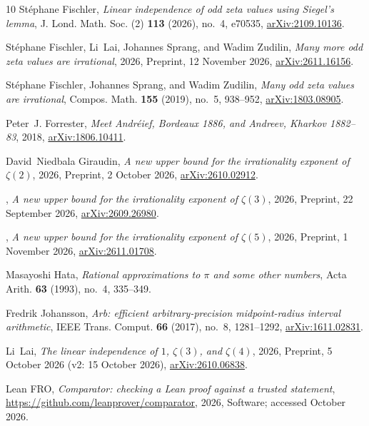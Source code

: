 \documentclass[11pt]{amsart}
\theoremstyle{definition}
\theoremstyle{remark}
\numberwithin{equation}{section}
\begin{document}
\begin{thebibliography}{10}
St\'ephane Fischler, \emph{Linear independence of odd zeta values using
  {S}iegel's lemma}, J. Lond. Math. Soc. (2) \textbf{113} (2026), no.~4,
  e70535, \href{https://arxiv.org/abs/2109.10136}{arXiv:2109.10136}.

St\'ephane Fischler, Li~Lai, Johannes Sprang, and Wadim Zudilin, \emph{Many
  more odd zeta values are irrational}, 2026, Preprint, 12 November 2026,
  \href{https://arxiv.org/abs/2611.16156}{arXiv:2611.16156}.

St\'ephane Fischler, Johannes Sprang, and Wadim Zudilin, \emph{Many odd zeta
  values are irrational}, Compos. Math. \textbf{155} (2019), no.~5, 938--952,
  \href{https://arxiv.org/abs/1803.08905}{arXiv:1803.08905}.

Peter~J. Forrester, \emph{Meet {A}ndr\'eief, {B}ordeaux 1886, and {A}ndreev,
  {K}harkov 1882--83}, 2018,
  \href{https://arxiv.org/abs/1806.10411}{arXiv:1806.10411}.

David~Niedbala Giraudin, \emph{A new upper bound for the irrationality exponent
  of {$\zeta(2)$}}, 2026, Preprint, 2 October 2026,
  \href{https://arxiv.org/abs/2610.02912}{arXiv:2610.02912}.

\bysame, \emph{A new upper bound for the irrationality exponent of
  {$\zeta(3)$}}, 2026, Preprint, 22 September 2026,
  \href{https://arxiv.org/abs/2609.26980}{arXiv:2609.26980}.

\bysame, \emph{A new upper bound for the irrationality exponent of
  {$\zeta(5)$}}, 2026, Preprint, 1 November 2026,
  \href{https://arxiv.org/abs/2611.01708}{arXiv:2611.01708}.

Masayoshi Hata, \emph{Rational approximations to {$\pi$} and some other
  numbers}, Acta Arith. \textbf{63} (1993), no.~4, 335--349.

Fredrik Johansson, \emph{Arb: efficient arbitrary-precision midpoint-radius
  interval arithmetic}, IEEE Trans. Comput. \textbf{66} (2017), no.~8,
  1281--1292, \href{https://arxiv.org/abs/1611.02831}{arXiv:1611.02831}.

Li~Lai, \emph{The linear independence of {$1$}, {$\zeta(3)$}, and
  {$\zeta(4)$}}, 2026, Preprint, 5 October 2026 (v2: 15 October 2026),
  \href{https://arxiv.org/abs/2610.06838}{arXiv:2610.06838}.

{Lean FRO}, \emph{Comparator: checking a {L}ean proof against a trusted
  statement}, \url{https://github.com/leanprover/comparator}, 2026, Software;
  accessed October 2026.


\end{thebibliography}
\end{document}
